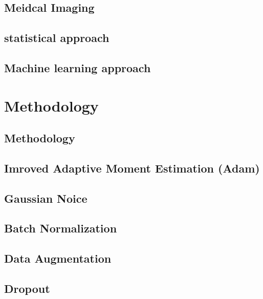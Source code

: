 \documentclass[acmsmall, review]{acmart}
\begin{document}
\subsection{Meidcal Imaging }
\subsection{statistical approach}
\subsection{Machine learning approach}


\section{Methodology}
\subsection{Methodology}
\subsection{Imroved Adaptive Moment Estimation (Adam)}
\subsection{Gaussian Noice}
\begin{comment}
	adding annealed Gaussian noise to the gradien
	-	surprisingly effective
	-	experiments indicate that adding annealed Gaussian noise by decaying the variance works better than using fixed Gaussian noise
	-	-adding n
	-	-random restarts and the use of a momentum-based optimizer like Adam are not sufficient to achieve the best results in the absence of added gradient noiseoise to the gradient helps in achieving higher average and best accuracy	content...
\end{comment}

\subsection{Batch Normalization}
\subsection{Data Augmentation}


\subsection{Dropout}
\end{document}
